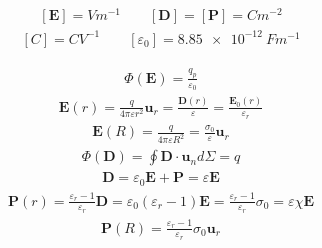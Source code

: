 \documentclass[10pt, twocolumn, a4paper, fleqn]{article}
\def\bb{\mathbf}
\def\e{\varepsilon}
\def\ke{{\varepsilon_r}}
\def\E{\bb{E}}
\def\P{\bb{P}}
\def\D{\bb{D}}
\def\u{\bb{u}}
\def\un{\bb{u}_n}
\begin{document}
\begin{equation*}\begin{split}
\left[\E\right]=\si{V m^{-1}} \qquad \left[\D\right]=\left[\P\right]=\si{C m^{-2}}
\end{split}\end{equation*}
\begin{equation*}\begin{split}
\left[C\right]=\si{C V^{-1}} \qquad \left[\e_0\right]=\SI{8.85e-12}{F m^{-1}}
\end{split}\end{equation*}

\begin{equation*}\begin{split}
\Phi\left(\E\right)=\frac{q_p}{\e_0}
\end{split}\end{equation*}
\begin{equation*}\begin{split}
\E\left(r\right)=\frac{q}{4\pi\e r^2}\u_r=\frac{\D\left(r\right)}{\e}=\frac{\E_0\left(r\right)}{\ke}
\end{split}\end{equation*}
\begin{equation*}\begin{split}
\E\left(R\right)=\frac{q}{4\pi\e R^2}=\frac{\sigma_0}{\e}\u_r
\end{split}\end{equation*}
\begin{equation*}\begin{split}
\Phi\left(\D\right)=\oint{\D\cdot \un d\Sigma}=q
\end{split}\end{equation*}
\begin{equation*}\begin{split}
\D=\e_0\E+\P=\e\E
\end{split}\end{equation*}
\begin{equation*}\begin{split}
\P\left(r\right)=\frac{\ke-1}{\ke}\D=\e_0\left(\ke-1\right)\E=\frac{\ke-1}{\ke}\sigma_0=\e\chi\E
\end{split}\end{equation*}
\begin{equation*}\begin{split}
\P\left(R\right)=\frac{\ke-1}{\ke}\sigma_0\u_r
\end{split}\end{equation*}
\end{document}
